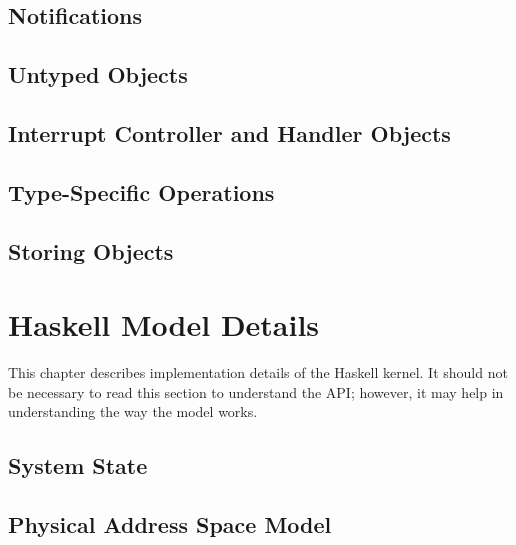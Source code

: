 \documentclass[a4paper,11pt,twoside]{report}
\begin{document}
\section{Notifications}\label{sec:object.notification}


\section{Untyped Objects}\label{sec:object.untyped}


\section{Interrupt Controller and Handler Objects}\label{sec:object.interrupt}


\section{Type-Specific Operations}\label{sec:object.objecttype}


\section{Storing Objects}\label{sec:object.instances}


\chapter{Haskell Model Details}\label{sec:model}

This chapter describes implementation details of the Haskell kernel. It should not be necessary to read this section to understand the API; however, it may help in understanding the way the model works.

\section{System State}\label{sec:model.statedata}


\section{Physical Address Space Model}\label{sec:model.pspace}

\end{document}
